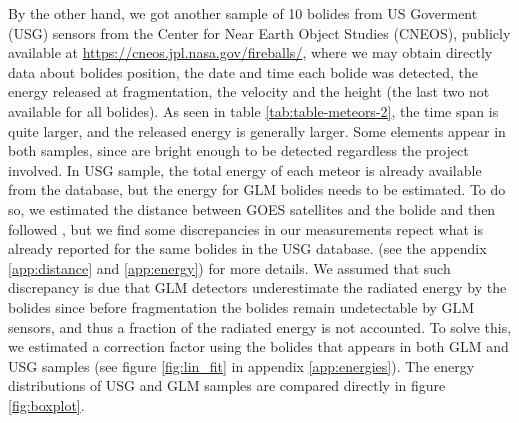 By the other hand, we got another sample of 10 bolides from US Goverment (USG) sensors from the Center for Near Earth Object Studies (CNEOS), publicly available at \url{https://cneos.jpl.nasa.gov/fireballs/}, where we may obtain directly data about bolides position, the date and time each bolide was detected, the energy released at fragmentation, the velocity and the height (the last two not available for all bolides). As seen in table \ref{tab:table-meteors-2}, the time span is quite larger, and the released energy is generally larger. Some elements appear in both samples, since are bright enough to be detected regardless the project involved. In USG sample, the total energy of each meteor is already available from the database, but the energy for GLM bolides needs to be estimated. To do so, we estimated the distance between GOES satellites and the bolide and then followed \citet{Jenniskens:2018}, but we find some discrepancies in our measurements repect what is already reported for the same bolides in the USG database. (see the appendix \ref{app:distance} and \ref{app:energy}) for more details. We assumed that such discrepancy is due that GLM detectors underestimate the radiated energy by the bolides since before fragmentation the bolides remain undetectable by GLM sensors, and thus a fraction of the radiated energy is not accounted. To solve this, we estimated a correction factor using the bolides that appears in both GLM and USG samples (see figure \ref{fig:lin_fit} in appendix \ref{app:energies}). The energy distributions of USG and GLM samples are compared directly in figure \ref{fig:boxplot}. 

